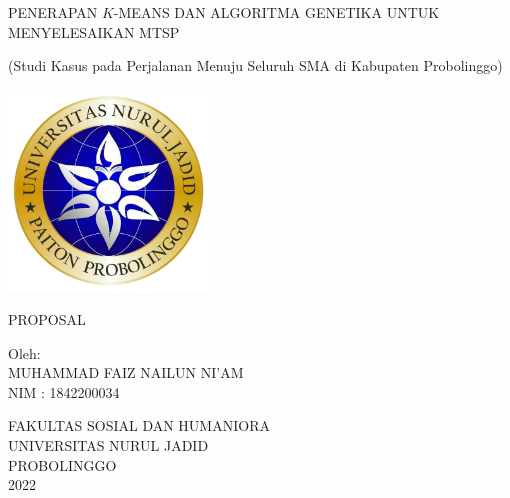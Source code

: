 \begin{titlepage}
   \begin{center}

       PENERAPAN $K$-MEANS DAN ALGORITMA GENETIKA UNTUK MENYELESAIKAN MTSP
       
       (Studi Kasus pada Perjalanan Menuju Seluruh SMA di Kabupaten Probolinggo)

       \vfill
       
       \includegraphics[width=0.4\textwidth]{logo.png}
       
       \vfill
       
       PROPOSAL
       
       \vfill
       
       Oleh:\\
       MUHAMMAD FAIZ NAILUN NI'AM\\
       NIM : 1842200034

       \vfill
       
       FAKULTAS SOSIAL DAN HUMANIORA\\       
       UNIVERSITAS NURUL JADID\\
       PROBOLINGGO\\
       2022
       
   \end{center}
\end{titlepage}